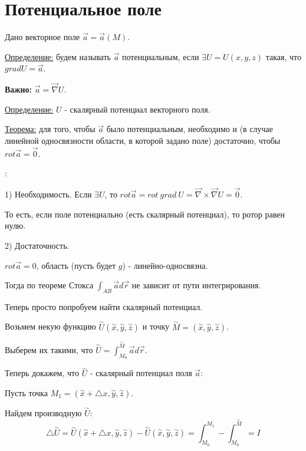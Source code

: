 \documentclass[12pt]{article}
\begin{document}
\section{Потенциальное поле}
Дано векторное поле $\overrightarrow{a} = \overrightarrow{a} (M)$.\par
\uline{Определение:} будем называть $\overrightarrow{a}$ потенциальным, если $\exists U = U(x,y,z)$ такая, что $grad U = \overrightarrow{a}$.\par
\textbf{Важно:} $\overrightarrow{a} = \overrightarrow{\nabla} U$.\par
\uline{Определение:} $U$ - скалярный потенциал векторного поля.\par
\uline{Теорема:} для того, чтобы $\overrightarrow{a}$ было потенциальным, необходимо и (в случае линейной односвязности области, в которой задано поле) достаточно, чтобы $rot \overrightarrow{a} = \overrightarrow{0}$.\par
{}:\par
1) Необходимость. Если $\exists U$, то $rot \overrightarrow{a} = rot \ grad \ U = \overrightarrow{\nabla} \times \overrightarrow{\nabla} U = \overrightarrow{0}$.\par
То есть, если поле потенциально (есть скалярный потенциал), то ротор равен нулю.\par
2) Достаточность.\par
$rot \overrightarrow{a} = 0$, область (пусть будет $g$) - линейно-односвязна.\par
Тогда по теореме Стокса $\int_{AB} \overrightarrow{a} d \overrightarrow{r}$ не зависит от пути интегрирования.\par
Теперь просто попробуем найти скалярный потенциал.\par
Возьмем некую функцию $\overset{\sim}{U}(\overset{\sim}{x},\overset{\sim}{y},\overset{\sim}{z})$ и точку $\overset{\sim}{M}=(\overset{\sim}{x},\overset{\sim}{y},\overset{\sim}{z})$.\par
Выберем их такими, что $\overset{\sim}{U} = \int_{M_0}^{\overset{\sim}{M}} \overrightarrow{a} d \overrightarrow{r}$.\par
Теперь докажем, что $\overset{\sim}{U}$ - скалярный потенциал поля $\overrightarrow{a}$:\par
Пусть точка $M_1 = (\overset{\sim}{x}+{\bigtriangleup x}, \overset{\sim}{y}, \overset{\sim}{z})$.\par
Найдем производную $\overset{\sim}{U}$:
$${\bigtriangleup \overset{\sim}{U}} = \overset{\sim}{U} (\overset{\sim}{x}+{\bigtriangleup x}, \overset{\sim}{y}, \overset{\sim}{z})-\overset{\sim}{U}(\overset{\sim}{x},\overset{\sim}{y},\overset{\sim}{z}) = \int_{M_0}^{M_1} - \int_{M_0}^{\overset{\sim}{M}} = I$$
\end{document}
